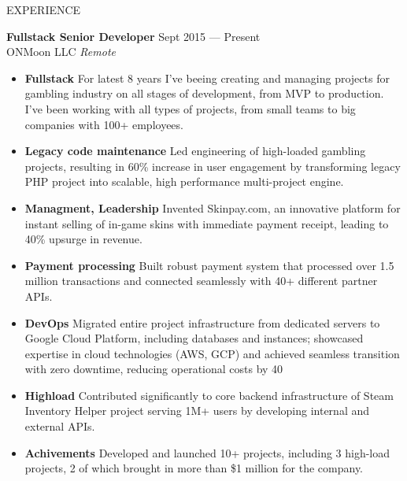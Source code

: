 \documentclass{template} %
\begin{document}
\begin{rSection}{EXPERIENCE}

\textbf{Fullstack Senior Developer} \hfill Sept 2015 --- Present\\
ONMoon LLC \hfill \textit{Remote}

\begin{minipage}{0.95\textwidth}
 \begin{itemize}
    \vspace{0.1cm}
    \itemsep 1pt {} 
    \item \textbf{Fullstack} For latest 8 years I've beeing creating and managing projects for gambling industry on all stages of development, from MVP to production. I've been working with all types of projects, from small teams to big companies with 100+ employees.
    \item \textbf{Legacy code maintenance} Led engineering of high-loaded gambling projects, resulting in 60\% increase in user
    engagement by transforming legacy PHP project into scalable, high performance multi-project engine.
    \item \textbf{Managment, Leadership} Invented Skinpay.com, an innovative platform for instant selling of in-game skins with immediate payment receipt, leading to 40\% upsurge in revenue.
    \item \textbf{Payment processing} Built robust payment system that processed over 1.5 million transactions and connected seamlessly with 40+ different partner APIs.
    \item \textbf{DevOps} Migrated entire project infrastructure from dedicated servers to Google Cloud Platform, including databases and instances; showcased expertise in cloud technologies (AWS, GCP) and achieved seamless transition with zero downtime, reducing operational costs by 40%
    \item \textbf{Highload} Contributed significantly to core backend infrastructure of Steam Inventory Helper project serving 1M+ users by developing internal and external APIs.
    \item \textbf{Achivements} Developed and launched 10+ projects, including 3 high-load projects, 2 of which brought in more than \$1 million for the company.
 \end{itemize}
\end{minipage}

\vspace{0.5cm}


\end{rSection}
\end{document}
